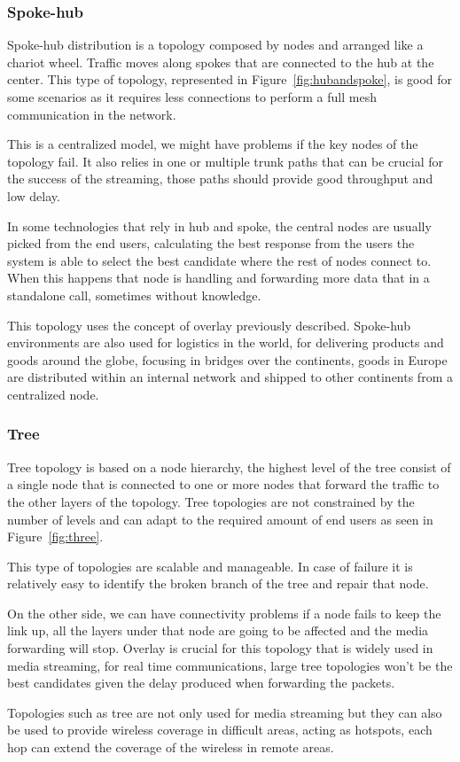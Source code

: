 \subsubsection{Spoke-hub}

Spoke-hub distribution is a topology composed by nodes and arranged like a chariot wheel. Traffic moves along spokes that are connected to the hub at the center. This type of topology, represented in Figure~\ref{fig:hubandspoke}, is good for some scenarios as it requires less connections to perform a full mesh communication in the network. 

This is a centralized model, we might have problems if the key nodes of the topology fail. It also relies in one or multiple trunk paths that can be crucial for the success of the streaming, those paths should provide good throughput and low delay.

In some technologies that rely in hub and spoke, the central nodes are usually picked from the end users, calculating the best response from the users the system is able to select the best candidate where the rest of nodes connect to. When this happens that node is handling and forwarding more data that in a standalone call, sometimes without knowledge.

This topology uses the concept of overlay previously described. Spoke-hub environments are also used for logistics in the world, for delivering products and goods around the globe, focusing in bridges over the continents, goods in Europe are distributed within an internal network and shipped to other continents from a centralized node.  

\subsubsection{Tree}
 
Tree topology is based on a node hierarchy, the highest level of the tree consist of a single node that is connected to one or more nodes that forward the traffic to the other layers of the topology. Tree topologies are not constrained by the number of levels and can adapt to the required amount of end users as seen in Figure~\ref{fig:three}.  

This type of topologies are scalable and manageable. In case of failure it is relatively easy to identify the broken branch of the tree and repair that node.

On the other side, we can have connectivity problems if a node fails to keep the link up, all the layers under that node are going to be affected and the media forwarding will stop. Overlay is crucial for this topology that is widely used in media streaming, for real time communications, large tree topologies won't be the best candidates given the delay produced when forwarding the packets.

Topologies such as tree are not only used for media streaming but they can also be used to provide wireless coverage in difficult areas, acting as hotspots, each hop can extend the coverage of the wireless in remote areas.

